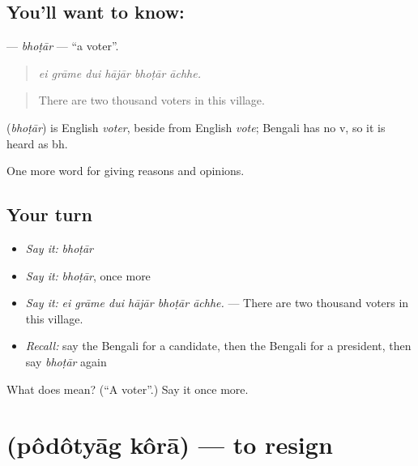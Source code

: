 \subsection*{You'll want to know: }
\textbf{} — \emph{bhoṭār} — \textquotedblleft{}a voter\textquotedblright{}.

\begin{quote}
     
\end{quote}

\begin{quote}
\emph{ei grāme dui hājār bhoṭār āchhe.}
\end{quote}

\begin{quote}
There are two thousand voters in this village.
\end{quote}

\begin{cousinweb}
\textbf{} (\emph{bhoṭār}) is English \emph{voter}, beside  from English \emph{vote}; Bengali has no v, so it is heard as bh.
\end{cousinweb}

\begin{grammarlens}[title={What you've built}]
One more word for giving reasons and opinions.
\end{grammarlens}

\subsection*{Your turn}
\begin{itemize}
\raggedright
  \item \emph{Say it:} \emph{bhoṭār}
  \item \emph{Say it:} \emph{bhoṭār}, once more
  \item \emph{Say it:} \emph{ei grāme dui hājār bhoṭār āchhe.} — There are two thousand voters in this village.
  \item \emph{Recall:} say the Bengali for a candidate, then the Bengali for a president, then say \emph{bhoṭār} again
\end{itemize}

\begin{tcolorbox}[breakable,colback=teal!4,colframe=teal!35!black,title={Before you move on}]
What does  mean? (\textquotedblleft{}A voter\textquotedblright{}.) Say it once more.
\end{tcolorbox}
\section[\texorpdfstring{\bn{পদত্যাগ} \bn{করা} (pôdôtyāg kôrā)}{পদত্যাগ করা (pôdôtyāg kôrā)}]{  (pôdôtyāg kôrā) — to resign}

